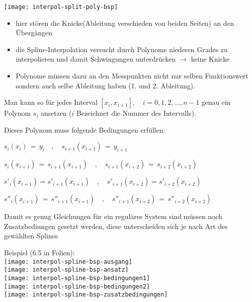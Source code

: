 \texttt{[image: interpol-split-poly-bsp]}

\begin{itemize}
	\item hier stören die Knicke(Ableitung verschieden von beiden Seiten) an
	      den Übergängen
	\item die Spline-Interpolation versucht durch Polynome niederen Grades zu
	      interpolieren und damit Schwingungen unterdrücken $\rightarrow$ keine Knicke
	\item Polynome müssen dazu an den Messpunkten nicht nur selben Funktionswert
	      sondern auch selbe Ableitung haben (1. und 2. Ableitung).
\end{itemize}

Man kann so für jedes Interval $[x_i, x_{i+1}], \quad i = 0,1,2,...,n-1$ genau
ein Polynom $s_i$ ansetzen ($i$ Bezeichnet die Nummer des Intervalls).

Dieses Polynom muss folgende Bedingungen erfüllen:
{\large
\begin{description}[itemsep=1mm]
	\item[Interpolation] $s_i(x_i) \, = \, y_i \quad,
			\quad s_{i+1}(x_{i+1}) \, = \, y_{i+1}$
	\item[stetiger Übergang] $s_i(x_{i+1}) \, = \, s_{i+1}(x_{i+1}) \quad,
			\quad s_{i+1}(x_{i+2}) \, = \, s_{i+2}(x_{i+2})$
	\item[keine Knicke] $s'_i(x_{i+1}) = s'_{i+1}(x_{i+1}) \quad,
			\quad s'_{i+1}(x_{i+2}) = s'_{i+2}(x_{i+2})$
	\item[gleiche Krümmung] $s''_i(x_{i+1}) \, = \, s''_{i+1}(x_{i+1}) \quad,
			\quad s''_{i+1}(x_{i+2}) \, = \, s''_{i+2}(x_{i+2})$
	\item[Zusatzbedingungen] Damit es genug Gleichungen für ein reguläres System
		sind müssen noch Zusatzbediungen gesetzt werden, diese unterscheiden sich
		je nach Art des gewählten Splines
\end{description}
}

Beispiel (6.5 in Folien):\\
\texttt{[image: interpol-spline-bsp-ausgang]}\\
\texttt{[image: interpol-spline-bsp-ansatz]}\\
\texttt{[image: interpol-spline-bsp-bedingungen1]}\\
\texttt{[image: interpol-spline-bsp-bedingungen2]}\\
\texttt{[image: interpol-spline-bsp-zusatzbedingungen]}\\




